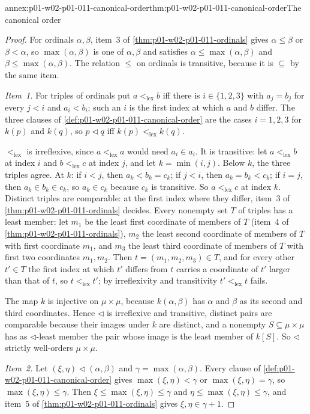 \begin{annexitem}{annex:p01-w02-p01-011-canonical-order}{thm:p01-w02-p01-011-canonical-order}{The canonical order}
\begin{proof}
For ordinals \(\alpha,\beta\), item~3 of
\cref{thm:p01-w02-p01-011-ordinals} gives \(\alpha\leq\beta\) or
\(\beta<\alpha\), so \(\max(\alpha,\beta)\) is one of \(\alpha,\beta\) and
satisfies \(\alpha\leq\max(\alpha,\beta)\) and
\(\beta\leq\max(\alpha,\beta)\). The relation \(\leq\) on ordinals is
transitive, because it is \(\subseteq\) by the same item.

\emph{Item~1.} For triples of ordinals put
\(a<_{\mathrm{lex}}b\) iff there is \(i\in\{1,2,3\}\) with \(a_j=b_j\) for
every \(j<i\) and \(a_i<b_i\); such an \(i\) is the first index at which
\(a\) and \(b\) differ. The three clauses of
\cref{def:p01-w02-p01-011-canonical-order} are the cases \(i=1,2,3\) for
\(k(p)\) and \(k(q)\), so \(p\lhd q\) iff \(k(p)<_{\mathrm{lex}}k(q)\).

\(<_{\mathrm{lex}}\) is irreflexive, since \(a<_{\mathrm{lex}}a\) would need
\(a_i\in a_i\). It is transitive: let \(a<_{\mathrm{lex}}b\) at index \(i\)
and \(b<_{\mathrm{lex}}c\) at index \(j\), and let \(k=\min(i,j)\). Below
\(k\), the three triples agree. At \(k\): if \(i<j\), then
\(a_k<b_k=c_k\); if \(j<i\), then \(a_k=b_k<c_k\); if \(i=j\), then
\(a_k\in b_k\in c_k\), so \(a_k\in c_k\) because \(c_k\) is transitive. So
\(a<_{\mathrm{lex}}c\) at index \(k\). Distinct triples are comparable: at
the first index where they differ, item~3 of
\cref{thm:p01-w02-p01-011-ordinals} decides. Every nonempty set \(T\) of
triples has a least member: let \(m_1\) be the least first coordinate of
members of \(T\) (item~4 of \cref{thm:p01-w02-p01-011-ordinals}), \(m_2\) the
least second coordinate of members of \(T\) with first coordinate \(m_1\),
and \(m_3\) the least third coordinate of members of \(T\) with first two
coordinates \(m_1,m_2\). Then \(t=(m_1,m_2,m_3)\in T\), and for every other
\(t'\in T\) the first index at which \(t'\) differs from \(t\) carries a
coordinate of \(t'\) larger than that of \(t\), so
\(t<_{\mathrm{lex}}t'\); by irreflexivity and transitivity
\(t'<_{\mathrm{lex}}t\) fails.

The map \(k\) is injective on \(\mu\times\mu\), because \(k(\alpha,\beta)\)
has \(\alpha\) and \(\beta\) as its second and third coordinates. Hence
\(\lhd\) is irreflexive and transitive, distinct pairs are comparable
because their images under \(k\) are distinct, and a nonempty
\(S\subseteq\mu\times\mu\) has as \(\lhd\)-least member the pair whose image
is the least member of \(k[S]\). So \(\lhd\) strictly well-orders
\(\mu\times\mu\).

\emph{Item~2.} Let \((\xi,\eta)\lhd(\alpha,\beta)\) and
\(\gamma=\max(\alpha,\beta)\). Every clause of
\cref{def:p01-w02-p01-011-canonical-order} gives
\(\max(\xi,\eta)<\gamma\) or \(\max(\xi,\eta)=\gamma\), so
\(\max(\xi,\eta)\leq\gamma\). Then \(\xi\leq\max(\xi,\eta)\leq\gamma\) and
\(\eta\leq\max(\xi,\eta)\leq\gamma\), and item~5 of
\cref{thm:p01-w02-p01-011-ordinals} gives \(\xi,\eta\in\gamma+1\).
\end{proof}
\end{annexitem}

